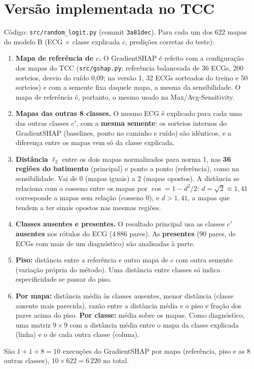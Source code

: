 \documentclass[11pt,a4paper]{article}
\begin{document}
\section{Versão implementada no TCC}\label{sec:versao}
Código: \texttt{src/random\_logit.py} (commit \texttt{3a81dec}). Para cada um dos 622 mapas do modelo B (ECG × classe explicada $c$, predições corretas do teste):
\begin{enumerate}
\item \textbf{Mapa de referência de $c$.} O GradientSHAP é refeito com a configuração dos mapas do TCC (\texttt{src/gshap.py}: referência balanceada de 36 ECGs, 200 sorteios, desvio do ruído 0,09; na versão 1, 32 ECGs sorteados do treino e 50 sorteios) e com a semente fixa daquele mapa, a mesma da sensibilidade. O mapa de referência é, portanto, o mesmo usado na Max/Avg-Sensitivity.
\item \textbf{Mapas das outras 8 classes.} O mesmo ECG é explicado para cada uma das outras classes $c'$, com a \textbf{mesma semente}: os sorteios internos do GradientSHAP (baselines, ponto no caminho e ruído) são idênticos, e a diferença entre os mapas vem só da classe explicada.
\item \textbf{Distância} $\ell_2$ entre os dois mapas normalizados para norma 1, nas \textbf{36 regiões do batimento} (principal) e ponto a ponto (referência), como na sensibilidade. Vai de 0 (mapas iguais) a 2 (mapas opostos). A distância se relaciona com o cosseno entre os mapas por $\cos = 1 - d^2/2$: $d = \sqrt{2} \approx 1{,}41$ corresponde a mapas sem relação (cosseno 0), e $d > 1{,}41$, a mapas que tendem a ter sinais opostos nas mesmas regiões.
\item \textbf{Classes ausentes e presentes.} O resultado principal usa as classes $c'$ \textbf{ausentes} nos rótulos do ECG (4\,886 pares). As \textbf{presentes} (90 pares, de ECGs com mais de um diagnóstico) são analisadas à parte.
\item \textbf{Piso:} distância entre a referência e outro mapa de $c$ com outra semente (variação própria do método). Uma distância entre classes só indica especificidade se passar do piso.
\item \textbf{Por mapa:} distância média às classes ausentes, menor distância (classe ausente mais parecida), razão entre a distância média e o piso e fração dos pares acima do piso. \textbf{Por classe:} média sobre os mapas. Como diagnóstico, uma matriz $9 \times 9$ com a distância média entre o mapa da classe explicada (linha) e o de cada outra classe (coluna).
\end{enumerate}
São $1 + 1 + 8 = 10$ execuções do GradientSHAP por mapa (referência, piso e as 8 outras classes), $10 \times 622 = 6\,220$ no total.
\end{document}
